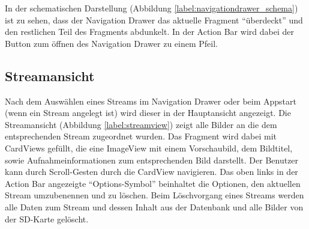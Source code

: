 In der schematischen Darstellung (Abbildung \ref{label:navigationdrawer_schema}) ist zu sehen, dass der Navigation Drawer das aktuelle Fragment \enquote{überdeckt} und den restlichen Teil des Fragments abdunkelt. In der Action Bar wird dabei der Button zum öffnen des Navigation Drawer zu einem Pfeil.

\subsection{Streamansicht}
Nach dem Auswählen eines Streams im Navigation Drawer oder beim Appstart (wenn ein Stream angelegt ist) wird dieser in der Hauptansicht angezeigt. Die Streamansicht (Abbildung  \ref{label:streamview}) zeigt alle Bilder an die dem entsprechenden Stream zugeordnet wurden. Das Fragment wird dabei mit CardViews gefüllt, die eine ImageView mit einem Vorschaubild, dem Bildtitel, sowie Aufnahmeinformationen zum entsprechenden Bild darstellt. Der Benutzer kann durch Scroll-Gesten durch die CardView navigieren. Das oben links in der Action Bar angezeigte \enquote{Options-Symbol} beinhaltet die Optionen, den aktuellen Stream umzubenennen und zu löschen. Beim Löschvorgang eines Streams werden alle Daten zum Stream und dessen Inhalt aus der Datenbank und alle Bilder von der SD-Karte gelöscht.


